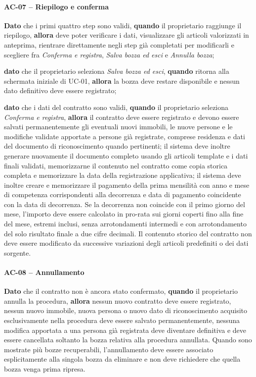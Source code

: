 \documentclass[12pt,a4paper]{article}
\begin{document}
\paragraph{AC-07 -- Riepilogo e conferma}
\textbf{Dato} che i primi quattro step sono validi,
\textbf{quando} il proprietario raggiunge il riepilogo,
\textbf{allora} deve poter verificare i dati, visualizzare gli articoli valorizzati in anteprima,
rientrare direttamente negli step già completati per modificarli e scegliere fra
\emph{Conferma e registra}, \emph{Salva bozza ed esci} e \emph{Annulla bozza};

\textbf{dato} che il proprietario seleziona \emph{Salva bozza ed esci},
\textbf{quando} ritorna alla schermata iniziale di UC-01,
\textbf{allora} la bozza deve restare disponibile e nessun dato definitivo deve essere registrato;

\textbf{dato} che i dati del contratto sono validi,
\textbf{quando} il proprietario seleziona \emph{Conferma e registra},
\textbf{allora} il contratto deve essere registrato e devono essere salvati permanentemente
gli eventuali nuovi immobili, le nuove persone e le modifiche validate apportate a persone già
registrate, comprese residenza e dati del documento di riconoscimento quando pertinenti; il sistema
deve inoltre generare nuovamente il documento completo usando gli articoli template e i dati finali
validati, memorizzarne il contenuto nel contratto come copia storica completa e memorizzare la data
della registrazione applicativa; il sistema deve inoltre creare e memorizzare il pagamento della
prima mensilità con anno e mese di competenza corrispondenti alla decorrenza e data di pagamento
coincidente con la data di decorrenza. Se la decorrenza non coincide con il primo giorno del mese,
l'importo deve essere calcolato in pro-rata sui giorni coperti fino alla fine del mese, estremi
inclusi, senza arrotondamenti intermedi e con arrotondamento del solo risultato finale a due cifre
decimali. Il contenuto storico del contratto non deve essere modificato da successive variazioni
degli articoli predefiniti o dei dati sorgente.

\paragraph{AC-08 -- Annullamento}
\textbf{Dato} che il contratto non è ancora stato confermato,
\textbf{quando} il proprietario annulla la procedura,
\textbf{allora} nessun nuovo contratto deve essere registrato, nessun nuovo immobile,
nuova persona o nuovo dato di riconoscimento acquisito esclusivamente nella procedura deve
essere salvato permanentemente, nessuna modifica apportata a una persona già registrata deve
diventare definitiva e deve essere cancellata soltanto la bozza relativa alla procedura annullata.
Quando sono mostrate più bozze recuperabili, l'annullamento deve essere associato esplicitamente
alla singola bozza da eliminare e non deve richiedere che quella bozza venga prima ripresa.
\end{document}
